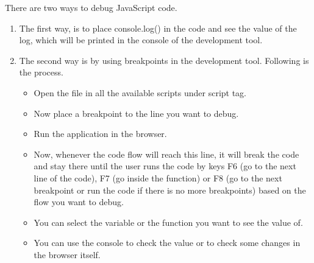 There are two ways to debug JavaScript code.
\begin{enumerate}
    \item The first way, is to place console.log() in the code and see the value of the log, which will be printed in the console of the development tool.
    \item The second way is by using breakpoints in the development tool. Following is the process.
    \begin{itemize}
        \item Open the file in all the available scripts under script tag.
        \item Now place a breakpoint to the line you want to debug.
        \item Run the application in the browser.
        \item Now, whenever the code flow will reach this line, it will break the code and stay there until the user runs the code by keys F6 (go to the next line of the code), F7 (go inside the function) or F8 (go to the next breakpoint or run the code if there is no more breakpoints) based on the flow you want to debug.
        \item You can select the variable or the function you want to see the value of.
        \item You can use the console to check the value or to check some changes in the browser itself.
    \end{itemize}    
\end{enumerate}




















